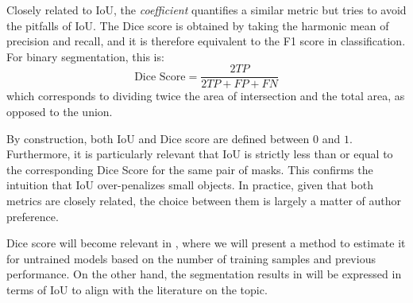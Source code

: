 Closely related to IoU, the \textit{ coefficient} quantifies a similar metric but tries to avoid the pitfalls of IoU. The Dice score is obtained by taking the harmonic mean of precision and recall, and it is therefore equivalent to the F1 score in classification. For binary segmentation, this is:
\begin{equation*}
    \text{Dice Score} = \dfrac{2TP}{2TP + FP + FN}
    \label{eq:dice}
\end{equation*}
which corresponds to dividing twice the area of intersection and the total area, as opposed to the union.

By construction, both IoU and Dice score are defined between $0$ and $1$. Furthermore, it is particularly relevant that IoU is strictly less than or equal to the corresponding Dice Score for the same pair of masks. This confirms the intuition that IoU over-penalizes small objects. In practice, given that both metrics are closely related, the choice between them is largely a matter of author preference.  

Dice score will become relevant in , where we will present a method to estimate it for untrained models based on the number of training samples and previous performance. On the other hand, the segmentation results in  will be expressed in terms of IoU to align with the literature on the topic.